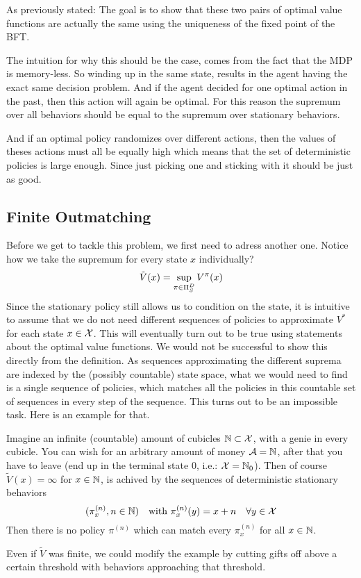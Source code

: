 As previously stated: The goal is to show that these two pairs of optimal value functions are actually the same using the uniqueness of the fixed point of the BFT. 

The intuition for why this should be the case, comes from the fact that the MDP is memory-less. So winding up in the same state, results in the agent having the exact same decision problem. And if the agent decided for one optimal action in the past, then this action will again be optimal. For this reason the supremum over all behaviors should be equal to the supremum over stationary behaviors. 

And if an optimal policy randomizes over different actions, then the values of theses actions must all be equally high which means that the set of deterministic policies is large enough. Since just picking one and sticking with it should be just as good.

\subsection{Finite Outmatching}
Before we get to tackle this problem, we first need to adress another one. Notice how we take the supremum for every state \(x\) individually? 
\begin{equation*}
\tilde{V}(x)=\sup_{\pi\in\Pi_S^D}V^\pi(x) 
\end{equation*}
Since the stationary policy still allows us to condition on the state, it is intuitive to assume that we do not need different sequences of policies to approximate \(V^*\) for each state \(x\in\mathcal{X}\). This will eventually turn out to be true using statements about the optimal value functions. We would not be successful to show this directly from the definition. As sequences approximating the different suprema are indexed by the (possibly countable) state space, what we would need to find is a single sequence of policies, which matches all the policies in this countable set of sequences in every step of the sequence. This turns out to be an impossible task. Here is an example for that. 

\begin{example} \label{genie cubicles}
Imagine an infinite (countable) amount of cubicles \(\mathbb{N} \subset \mathcal{X}\), with a genie in every cubicle. You can wish for an arbitrary amount of money \(\mathcal{A}=\mathbb{N}\), after that you have to leave (end up in the terminal state \(0\), i.e.: \(\mathcal{X}=\mathbb{N}_0\)). Then of course \(\tilde{V}(x)=\infty\) for \(x\in\mathbb{N}\), is achived by the sequences of deterministic stationary behaviors 
\[
	(\pi_x^{(n)}, n\in\mathbb{N})\quad  \text{with } \pi_x^{(n)}(y)=x+n\quad \forall y\in\mathcal{X}
\]
Then there is no policy \(\pi^{(n)}\) which can match every \(\pi_x^{(n)}\) for all \(x\in\mathbb{N}\).

Even if \(\tilde{V}\) was finite, we could modify the example by cutting gifts off above a certain threshold with behaviors approaching that threshold. 
\end{example}

